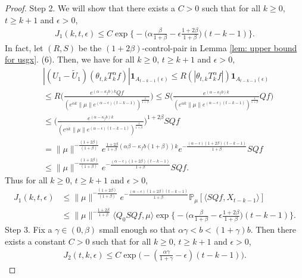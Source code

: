 \documentclass[12pt]{amsart}
\theoremstyle{plain}
\theoremstyle{definition}
\numberwithin{equation}{section}
\begin{document}
\begin{proof}
Step 2.  We will show that there exists a $C>0$ such that for all $k\geq 0$, $t\geq k+1$ and $\epsilon> 0$,
    \begin{align}
    \label{lemma31q}
      J_1(k,t,\epsilon)\leq C\exp\Big\{-\Big(\alpha\frac{\beta}{1+\beta}-\epsilon\frac{1+2\beta}{1+\beta}\Big)(t-k-1)\Big\}.
    \end{align}
	In fact, let $(R,S)$ be the $(1+2\beta)$-control-pair in Lemma \ref{lem: upper bound for usgx}. (6).
	Then, we have for all $k\geq 0$, $t\geq k+1$ and $\epsilon> 0$,
\begin{align}
   & |(U_1 - \tilde U_1)(\theta_{t,k}T_k^{\alpha}f)|\mathbf{1}_{A_{t-k-1}(\epsilon)}
   \leq R(|\theta_{t,k}T_k^{\alpha}f|)\mathbf{1}_{A_{t-k-1}(\epsilon)}
   \\&\leq R \Big(\frac{e^{(\alpha-\kappa_fb)k} Qf}{(e^{\alpha k}\|\mu\|e^{(\alpha-\epsilon)(t-k-1)})^\frac{1}{1+\beta}}\Big)
    \leq S \Big(\frac{e^{(\alpha-\kappa_fb)k}}{(e^{\alpha k}\|\mu\|e^{(\alpha-\epsilon)(t-k-1)})^\frac{1}{1+\beta}}Qf\Big)
   \\&\leq \Big(\frac{e^{(\alpha-\kappa_fb)k}}{(e^{\alpha k}\|\mu\|e^{(\alpha-\epsilon)(t-k-1)})^\frac{1}{1+\beta}}\Big)^{1+2\beta}SQf
   \\&=\|\mu\|^{-\frac{(1+2\beta)}{(1+\beta)}}e^{\frac{1+2\beta}{1+\beta}(\alpha\beta-\kappa_fb(1+\beta))k}e^{-\frac{(\alpha-\epsilon)(1+2\beta)(t-k-1)}{1+\beta}}SQf
   \\&\leq\|\mu\|^{-\frac{(1+2\beta)}{(1+\beta)}} e^{-\frac{(\alpha-\epsilon)(1+2\beta)(t-k-1)}{1+\beta}}SQf.
\end{align}
Thus for all $k\geq 0$, $t\geq k+1$ and $\epsilon> 0$,
\begin{align}
\label{eq: estimate of J1}
     J_1(k,t,\epsilon)&
     \leq \|\mu\|^{-\frac{(1+2\beta)}{(1+\beta)}} e^{-\frac{(\alpha-\epsilon)(1+2\beta)(t-k-1)}{1+\beta}}\mathbb{P}_{\mu}[\langle SQf,X_{t-k-1}\rangle]\\
     & \leq \|\mu\|^{-\frac{1+2\beta}{1+\beta}} \langle Q_0 SQf, \mu \rangle \exp\Big\{-\Big(\alpha\frac{\beta}{1+\beta}-\epsilon\frac{1+2\beta}{1+\beta}\Big)(t-k-1)\Big\}.
\end{align}
	Step 3.
	Fix a $\gamma\in(0,\beta)$ small enough so that $\alpha \gamma < b < (1+\gamma)b$.
	Then there exists a constant $C > 0$ such that for all $k\geq 0$, $t\geq k+1$ and $\epsilon> 0$,
\begin{align}
\label{eq:31step3}
    J_2(t,k,\epsilon)
    \leq C \exp\Big(-(\frac{\alpha\gamma}{1+\gamma}-\epsilon)(t-k-1)\Big).
\end{align}

\end{proof}
\end{document}
